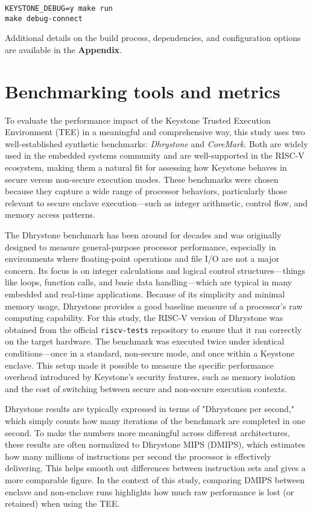 \begin{verbatim}
KEYSTONE_DEBUG=y make run
make debug-connect
\end{verbatim}

Additional details on the build process, dependencies, and configuration options are available in the \textbf{Appendix}.

\section{Benchmarking tools and metrics}

To evaluate the performance impact of the Keystone Trusted Execution Environment (TEE) in a meaningful and comprehensive way, this study uses two well-established synthetic benchmarks: \textit{Dhrystone} and \textit{CoreMark}. Both are widely used in the embedded systems community and are well-supported in the RISC-V ecosystem, making them a natural fit for assessing how Keystone behaves in secure versus non-secure execution modes. These benchmarks were chosen because they capture a wide range of processor behaviors, particularly those relevant to secure enclave execution—such as integer arithmetic, control flow, and memory access patterns.

The Dhrystone benchmark has been around for decades and was originally designed to measure general-purpose processor performance, especially in environments where floating-point operations and file I/O are not a major concern. Its focus is on integer calculations and logical control structures—things like loops, function calls, and basic data handling—which are typical in many embedded and real-time applications. Because of its simplicity and minimal memory usage, Dhrystone provides a good baseline measure of a processor’s raw computing capability. For this study, the RISC-V version of Dhrystone was obtained from the official \texttt{riscv-tests} repository to ensure that it ran correctly on the target hardware. The benchmark was executed twice under identical conditions—once in a standard, non-secure mode, and once within a Keystone enclave. This setup made it possible to measure the specific performance overhead introduced by Keystone’s security features, such as memory isolation and the cost of switching between secure and non-secure execution contexts.

Dhrystone results are typically expressed in terms of "Dhrystones per second," which simply counts how many iterations of the benchmark are completed in one second. To make the numbers more meaningful across different architectures, these results are often normalized to Dhrystone MIPS (DMIPS), which estimates how many millions of instructions per second the processor is effectively delivering. This helps smooth out differences between instruction sets and gives a more comparable figure. In the context of this study, comparing DMIPS between enclave and non-enclave runs highlights how much raw performance is lost (or retained) when using the TEE.

